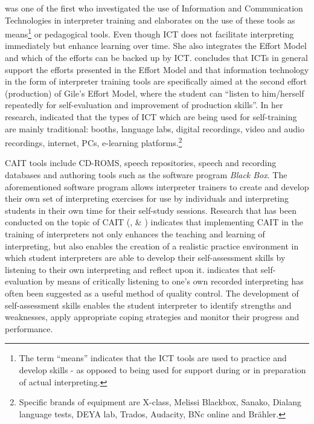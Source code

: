 \documentclass[output=paper]{langsci/langscibook}
\begin{document}
\citet[229]{Berber2010} was one of the first who investigated the use of Information and Communication Technologies in interpreter training and elaborates on the use of these tools as means\footnote{The term “means” indicates that the ICT tools are used to practice and develop skills - as opposed to being used for support during or in preparation of actual interpreting.} or pedagogical tools. Even though ICT does not facilitate interpreting immediately but enhance learning over time. She also integrates the Effort Model \citep{Gile1995} and which of the efforts can be backed up by ICT. \citet[237]{Berber2010} concludes that ICTs in general support the efforts presented in the Effort Model and that information technology in the form of interpreter training tools are specifically aimed at the second effort (production) of Gile’s Effort Model, where the student can “listen to him/herself repeatedly for self-evaluation and improvement of production skills”. In her research, \citet[243]{Berber2010} indicated that the types of ICT which are being used for self-training are mainly traditional: booths, language labs, digital recordings, video and audio recordings, internet, PCs, e-learning platforms.\footnote{Specific brands of equipment are X-class, Melissi Blackbox, Sanako, Dialang language tests, DEYA lab, Trados, Audacity, BNc online and Brähler.}

CAIT tools include CD-ROMS, speech repositories, speech and recording databases and authoring tools such as the software program \textit{Black Box}. The aforementioned software program allows interpreter trainers to create and develop their own set of interpreting exercises for use by individuals and interpreting students in their own time for their self-study sessions. Research that has been conducted on the topic of CAIT (\citealt{Sandrelli2007}, \citealt{Pinazo2008} \& \citealt{Lim2013}) indicates that implementing CAIT in the training of interpreters not only enhances the teaching and learning of interpreting, but also enables the creation of a realistic practice environment in which student interpreters are able to develop their self-assessment skills by listening to their own interpreting and reflect upon it. \citet[252]{Bartlomiejczyk2007} indicates that self-evaluation by means of critically listening to one’s own recorded interpreting has often been suggested as a useful method of quality control. The development of self-assessment skills enables the student interpreter to identify strengths and weaknesses, apply appropriate coping strategies and monitor their progress and performance.
\end{document}
